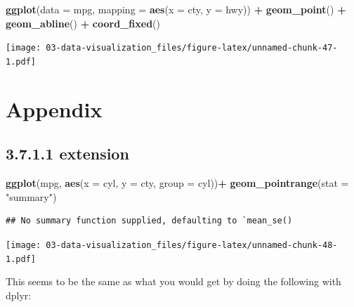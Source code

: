 \documentclass[]{book}
\newenvironment{Shaded}{\begin{snugshade}}{\end{snugshade}}
\newcommand{\DataTypeTok}[1]{\textcolor[rgb]{0.13,0.29,0.53}{#1}}
\newcommand{\KeywordTok}[1]{\textcolor[rgb]{0.13,0.29,0.53}{\textbf{#1}}}
\newcommand{\NormalTok}[1]{#1}
\newcommand{\OperatorTok}[1]{\textcolor[rgb]{0.81,0.36,0.00}{\textbf{#1}}}
\newcommand{\StringTok}[1]{\textcolor[rgb]{0.31,0.60,0.02}{#1}}
\theoremstyle{definition}
\theoremstyle{definition}
\theoremstyle{definition}
\theoremstyle{remark}
\begin{document}
\begin{Shaded}
\begin{Highlighting}[]
\KeywordTok{ggplot}\NormalTok{(}\DataTypeTok{data =}\NormalTok{ mpg, }\DataTypeTok{mapping =} \KeywordTok{aes}\NormalTok{(}\DataTypeTok{x =}\NormalTok{ cty, }\DataTypeTok{y =}\NormalTok{ hwy)) }\OperatorTok{+}
\StringTok{  }\KeywordTok{geom_point}\NormalTok{() }\OperatorTok{+}\StringTok{ }
\StringTok{  }\KeywordTok{geom_abline}\NormalTok{() }\OperatorTok{+}
\StringTok{  }\KeywordTok{coord_fixed}\NormalTok{()}
\end{Highlighting}
\end{Shaded}

\texttt{[image: 03-data-visualization\_files/figure-latex/unnamed-chunk-47-1.pdf]}

\hypertarget{appendix}{%
\chapter{Appendix}\label{appendix}}

\hypertarget{extension}{%
\section{3.7.1.1 extension}\label{extension}}

\begin{Shaded}
\begin{Highlighting}[]
\KeywordTok{ggplot}\NormalTok{(mpg, }\KeywordTok{aes}\NormalTok{(}\DataTypeTok{x =}\NormalTok{ cyl, }\DataTypeTok{y =}\NormalTok{ cty, }\DataTypeTok{group =}\NormalTok{ cyl))}\OperatorTok{+}
\StringTok{  }\KeywordTok{geom_pointrange}\NormalTok{(}\DataTypeTok{stat =} \StringTok{"summary"}\NormalTok{)}
\end{Highlighting}
\end{Shaded}

\begin{verbatim}
## No summary function supplied, defaulting to `mean_se()
\end{verbatim}

\texttt{[image: 03-data-visualization\_files/figure-latex/unnamed-chunk-48-1.pdf]}

This seems to be the same as what you would get by doing the following
with dplyr:
\end{document}
